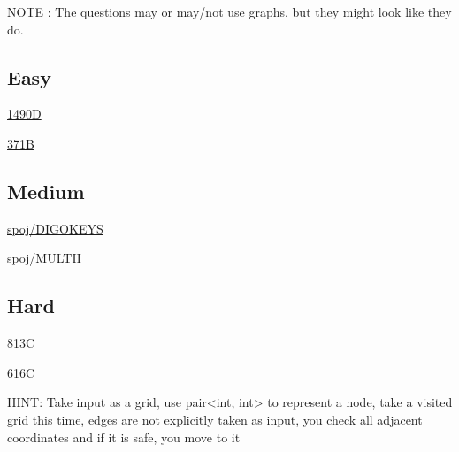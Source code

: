 \documentclass[13pt,oneside,a4paper]{book}
\begin{document}
NOTE : The questions may or may/not use graphs, but they 
might look like they do.

\subsection{Easy}

\href{https://codeforces.com/problemset/problem/1490/D}{1490D}

\smallskip

\href{https://codeforces.com/problemset/problem/371/B}{371B}

\smallskip

\subsection{Medium}

\href{https://www.spoj.com/problems/DIGOKEYS/}{spoj/DIGOKEYS}

\smallskip

\href{https://www.spoj.com/problems/MULTII/}{spoj/MULTII}

\smallskip

\subsection{Hard}

\href{https://codeforces.com/contest/813/problem/C}{813C}

\smallskip

\href{https://codeforces.com/problemset/problem/616/C}{616C}

HINT: Take input as a grid, use pair<int, int> to represent a node,
take a visited grid this time, edges are not explicitly taken as input, 
you check all adjacent coordinates and if it is safe, you move to it

\smallskip
\end{document}
